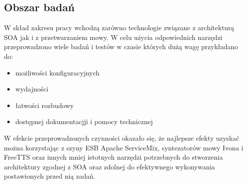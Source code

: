 \subsection{Obszar badań} %
W skład zakresu pracy wchodzą zarówno technologie związane z architekturą SOA jak i z przetwarzaniem mowy. W celu użycia odpowiednich narzędzi przeprowadzono wiele badań i testów w czasie których dużą wagę przykładano do:
\begin{itemize}
 	\item możliwości konfiguracyjnych
	\item wydajności
	\item łatwości rozbudowy
	\item dostępnej dokumentacjji i pomocy technicznej
\end{itemize}
W efekcie przeprowadzonych czynności okazało się, że najlepsze efekty uzyskać można korzystając z szyny ESB  Apache ServiceMix,  syntezatorów mowy Ivona i FreeTTS oraz innych mniej istotnych narzędzi potrzebnych do stworzenia architektury zgodnej z SOA oraz zdolnej do efektywnego wykonywania postawionych przed nią zadań. 


